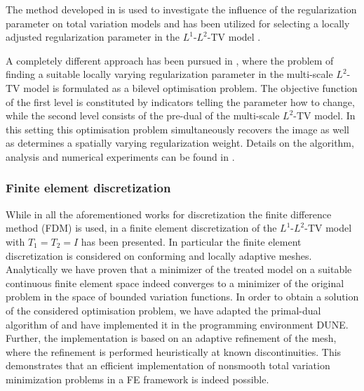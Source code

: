 \documentclass[enabledeprecatedfontcommands,cleardoublepage=empty,headsepline,twoside,11pt,DIV=15,BCOR=12mm,final]{scrartcl}
\newcommand{\dune}{\textsf{DUNE}\xspace}
\begin{document}
The method developed in  is used to investigate the influence of the regularization parameter on total variation models  and has been utilized for selecting a locally adjusted regularization parameter in the $L^1$-$L^2$-TV model .

A completely different approach has been pursued in , where the problem of finding a suitable locally varying regularization parameter in the multi-scale $L^2$-TV model is formulated as a bilevel optimisation problem. The objective function of the first level is constituted by indicators telling the parameter how to change, while the second level consists of the pre-dual of the multi-scale $L^2$-TV model. In this setting this optimisation problem simultaneously recovers the image as well as determines a spatially varying regularization weight. Details on the algorithm, analysis and numerical experiments can be found in . 



\subsubsection{Finite element discretization}

While in all the aforementioned works for discretization the finite difference method (FDM) is used, in  a finite element discretization of the $L^1$-$L^2$-TV model with $T_1=T_2=I$ has been presented. In particular the finite element discretization is considered on conforming and locally adaptive meshes. Analytically we have proven that a minimizer of the treated model on a suitable continuous finite element space indeed converges to a minimizer of the original problem in the space of bounded variation functions. In order to obtain a solution of the considered optimisation problem, we have adapted the primal-dual algorithm of \cite{ChaPocFEM}  and have implemented it in the programming environment \dune \cite{Blaetal}. Further, the implementation is based on an adaptive refinement of the mesh, where the refinement is performed heuristically at known discontinuities. This demonstrates that an efficient implementation of nonsmooth total variation minimization problems in a FE framework is indeed possible. 
\end{document}

